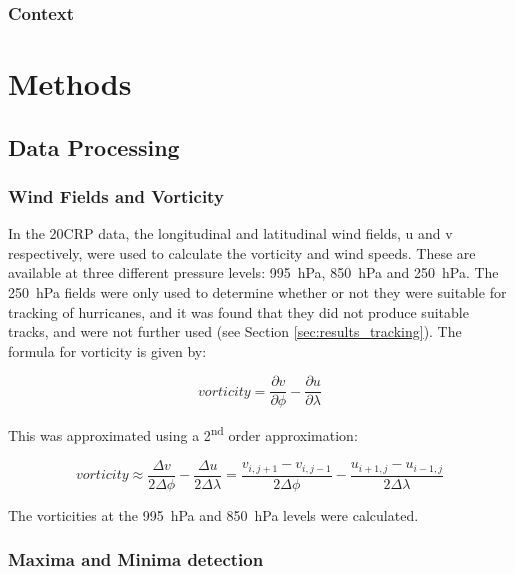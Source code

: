 \documentclass[pdftex,12pt,a4paper]{report}
\newcommand{\ts}{\textsuperscript}
\begin{document}
\subsection{Context}


\chapter{Methods}

\section{Data Processing}

\subsection{Wind Fields and Vorticity}

In the 20CRP data, the longitudinal and latitudinal wind fields, u and v respectively, were used to calculate the vorticity and wind speeds. These are available at three different pressure levels: \SI{995}{hPa}, \SI{850}{hPa} and \SI{250}{hPa}. The \SI{250}{hPa} fields were only used to determine whether or not they were suitable for tracking of hurricanes, and it was found that they did not produce suitable tracks, and were not further used (see Section \ref{sec:results_tracking}). The formula for vorticity is given by:

\begin{equation}
    vorticity = \frac{\partial v}{\partial \phi} - \frac{\partial u}{\partial \lambda}
    \label{eqn:vorticity}
\end{equation}

This was approximated using a 2\ts{nd} order approximation:

\begin{equation}
    vorticity \approx \frac{\Delta v}{2 \Delta \phi} - \frac{\Delta u}{2 \Delta \lambda} = \frac{v_{i,j+1} - v_{i,j-1}}{2 \Delta \phi} - \frac{u_{i+1,j} - u_{i-1,j}}{2 \Delta \lambda}
    \label{eqn:vorticity_2nd_order}
\end{equation}

The vorticities at the \SI{995}{hPa} and \SI{850}{hPa} levels were calculated.

\subsection{Maxima and Minima detection}
\label{sec:methods_maxima_minima}
\end{document}

